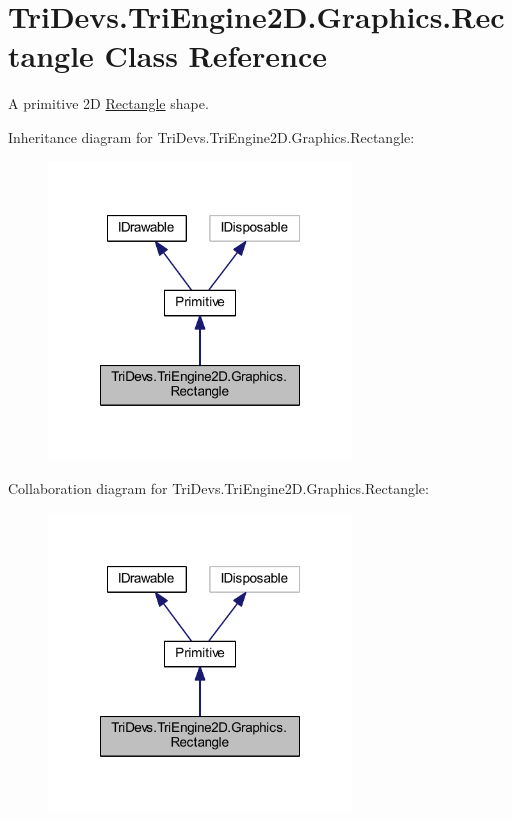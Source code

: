\hypertarget{class_tri_devs_1_1_tri_engine2_d_1_1_graphics_1_1_rectangle}{\section{Tri\-Devs.\-Tri\-Engine2\-D.\-Graphics.\-Rectangle Class Reference}
\label{class_tri_devs_1_1_tri_engine2_d_1_1_graphics_1_1_rectangle}
}


A primitive 2\-D \hyperlink{class_tri_devs_1_1_tri_engine2_d_1_1_graphics_1_1_rectangle}{Rectangle} shape.  




Inheritance diagram for Tri\-Devs.\-Tri\-Engine2\-D.\-Graphics.\-Rectangle\-:
\nopagebreak
\begin{figure}[H]
\begin{center}
\leavevmode
\includegraphics[width=228pt]{class_tri_devs_1_1_tri_engine2_d_1_1_graphics_1_1_rectangle__inherit__graph}
\end{center}
\end{figure}


Collaboration diagram for Tri\-Devs.\-Tri\-Engine2\-D.\-Graphics.\-Rectangle\-:
\nopagebreak
\begin{figure}[H]
\begin{center}
\leavevmode
\includegraphics[width=228pt]{class_tri_devs_1_1_tri_engine2_d_1_1_graphics_1_1_rectangle__coll__graph}
\end{center}
\end{figure}
